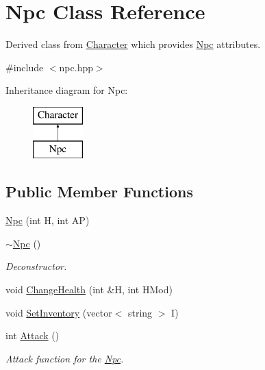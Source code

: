 \hypertarget{classNpc}{\section{Npc Class Reference}
\label{classNpc}
}


Derived class from \hyperlink{classCharacter}{Character} which provides \hyperlink{classNpc}{Npc} attributes.  




{\ttfamily \#include $<$npc.\-hpp$>$}

Inheritance diagram for Npc\-:\begin{figure}[H]
\begin{center}
\leavevmode
\includegraphics[height=2.000000cm]{classNpc}
\end{center}
\end{figure}
\subsection*{Public Member Functions}
\begin{DoxyCompactItemize}
\item 
\hyperlink{classNpc_aa244a652f5adb9673767f91010dfe45a}{Npc} (int H, int A\-P)
\item 
\hypertarget{classNpc_a2249c5155af3d692e51ff610064e81fe}{\hyperlink{classNpc_a2249c5155af3d692e51ff610064e81fe}{$\sim$\-Npc} ()}\label{classNpc_a2249c5155af3d692e51ff610064e81fe}

\begin{DoxyCompactList}\small\item\em Deconstructor. \end{DoxyCompactList}\item 
void \hyperlink{classNpc_afeddebb46618f8c5bf9c5d054ba0af51}{Change\-Health} (int \&H, int H\-Mod)
\item 
void \hyperlink{classNpc_a20f484d7473d1e5e1de494a54859d071}{Set\-Inventory} (vector$<$ string $>$ I)
\item 
\hypertarget{classNpc_a52f4e7d7658c003737d8582f081481b6}{int \hyperlink{classNpc_a52f4e7d7658c003737d8582f081481b6}{Attack} ()}\label{classNpc_a52f4e7d7658c003737d8582f081481b6}

\begin{DoxyCompactList}\small\item\em Attack function for the \hyperlink{classNpc}{Npc}. \end{DoxyCompactList}\end{DoxyCompactItemize}


